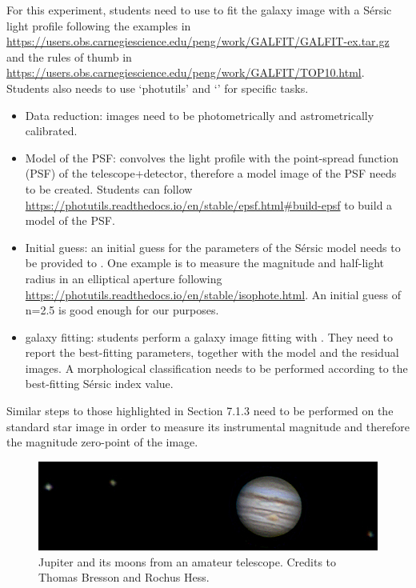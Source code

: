 \documentclass[a4paper, 11pt, fleqn]{memoir}
\begin{document}
For this experiment, students need to use  to fit the galaxy image with a Sérsic light profile following the examples in \url{https://users.obs.carnegiescience.edu/peng/work/GALFIT/GALFIT-ex.tar.gz} and the rules of thumb in \url{https://users.obs.carnegiescience.edu/peng/work/GALFIT/TOP10.html}.
Students also needs to use `photutils' and `' for specific tasks.
\begin{itemize}
    \item
          Data reduction: images need to be photometrically and astrometrically
          calibrated.
    \item
          Model of the PSF:  convolves the light profile with the
          point-spread function (PSF) of the telescope+detector, therefore a model image
          of the PSF needs to be created.
          Students can follow \url{https://photutils.readthedocs.io/en/stable/epsf.html#build-epsf} to build a model of the PSF.
    \item
          Initial guess: an initial guess for the parameters of the Sérsic model needs
          to be provided to .
          One example is to measure the magnitude and half-light radius in an elliptical aperture following \url{https://photutils.readthedocs.io/en/stable/isophote.html}.
          An initial guess of n=2.5 is good enough for our purposes.
    \item
          galaxy fitting: students perform a galaxy image fitting with .
          They need to report the best-fitting parameters, together with the model and the residual images.
          A morphological classification needs to be performed according to the best-fitting Sérsic index value.
\end{itemize}

Similar steps to those highlighted in Section 7.1.3 need to be performed on the standard star image in order to measure its instrumental magnitude and therefore the magnitude zero-point of the image.

\begin{figure}[t!]
    \centering
    \includegraphics[width=12cm]{jupiter}
    \caption{Jupiter and its moons from an amateur telescope.
        Credits to Thomas Bresson and Rochus Hess.
    }
    \label{fig:jupyter}
\end{figure}
\end{document}

